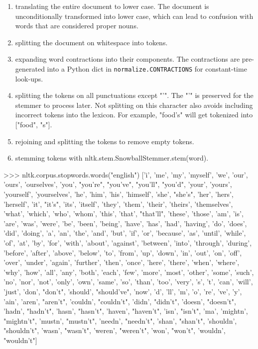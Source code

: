 \documentclass[11pt]{article}
\begin{document}
\begin{enumerate}
    \item translating the entire document to lower case. The document is unconditionally transformed into lower case, which can lead to confusion with words that are considered proper nouns.

    \item splitting the document on whitespace into tokens.

    \item expanding word contractions into their components. The contractions are pre-generated into a Python dict in \texttt{normalize.CONTRACTIONS} for constant-time look-ups.

    \item splitting the tokens on all punctuations except "'". The "'" is preserved for the stemmer to process later. Not splitting on this character also avoids including incorrect tokens into the lexicon. For example, "food's" will get tokenized into ["food", "s"].

    \item rejoining and splitting the tokens to remove empty tokens.

    \item stemming tokens with nltk.stem.SnowballStemmer.stem(word).
\end{enumerate}

>>> nltk.corpus.stopwords.words("english")
['i', 'me', 'my', 'myself', 'we', 'our', 'ours', 'ourselves', 'you', "you're", "you've", "you'll", "you'd", 'your', 'yours', 'yourself', 'yourselves', 'he', 'him', 'his', 'himself', 'she', "she's", 'her', 'hers', 'herself', 'it', "it's", 'its', 'itself', 'they', 'them', 'their', 'theirs', 'themselves', 'what', 'which', 'who', 'whom', 'this', 'that', "that'll", 'these', 'those', 'am', 'is', 'are', 'was', 'were', 'be', 'been', 'being', 'have', 'has', 'had', 'having', 'do', 'does', 'did', 'doing', 'a', 'an', 'the', 'and', 'but', 'if', 'or', 'because', 'as', 'until', 'while', 'of', 'at', 'by', 'for', 'with', 'about', 'against', 'between', 'into', 'through', 'during', 'before', 'after', 'above', 'below', 'to', 'from', 'up', 'down', 'in', 'out', 'on', 'off', 'over', 'under', 'again', 'further', 'then', 'once', 'here', 'there', 'when', 'where', 'why', 'how', 'all', 'any', 'both', 'each', 'few', 'more', 'most', 'other', 'some', 'such', 'no', 'nor', 'not', 'only', 'own', 'same', 'so', 'than', 'too', 'very', 's', 't', 'can', 'will', 'just', 'don', "don't", 'should', "should've", 'now', 'd', 'll', 'm', 'o', 're', 've', 'y', 'ain', 'aren', "aren't", 'couldn', "couldn't", 'didn', "didn't", 'doesn', "doesn't", 'hadn', "hadn't", 'hasn', "hasn't", 'haven', "haven't", 'isn', "isn't", 'ma', 'mightn', "mightn't", 'mustn', "mustn't", 'needn', "needn't", 'shan', "shan't", 'shouldn', "shouldn't", 'wasn', "wasn't", 'weren', "weren't", 'won', "won't", 'wouldn', "wouldn't"]
\end{document}
